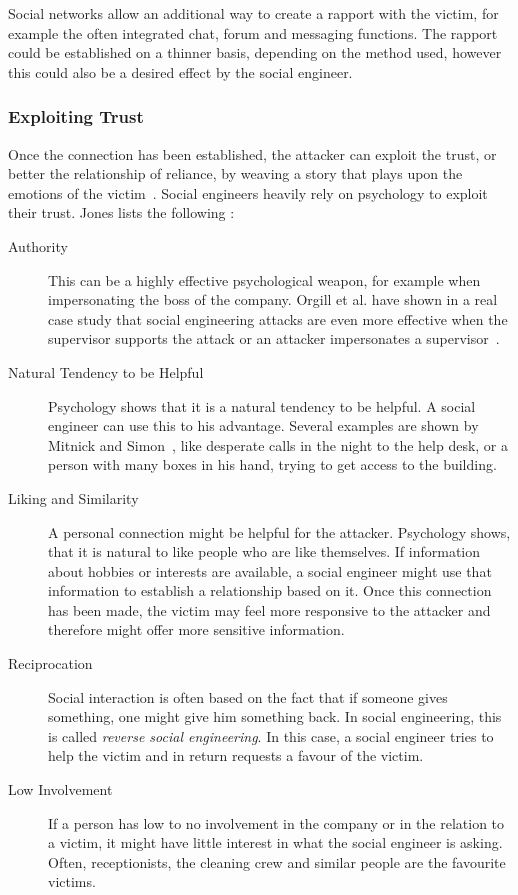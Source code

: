 Social networks allow an additional way to create a rapport with the victim,
for example the often integrated chat, forum and messaging functions. The
rapport could be established on a thinner basis, depending on the method used,
however this could also be a desired effect by the social engineer.


\subsubsection{Exploiting Trust}

Once the connection has been established, the attacker can exploit the trust,
or better the relationship of reliance, by \glqq{}weaving a story that plays
upon the emotions of the victim\grqq{}~\cite{thornburgh2004}. Social engineers
heavily rely on psychology to exploit their trust. Jones lists the following
\cite{jones2004}:

\begin{description}

\item[Authority] This can be a highly effective psychological weapon, for
  example when impersonating the boss of the company. Orgill et al. have
  shown in a real case study that social engineering attacks are even more
  effective when the supervisor supports the attack or an attacker
  impersonates a supervisor~\cite{orgill2004}.
\item[Natural Tendency to be Helpful] Psychology shows that it is a natural
  tendency to be helpful. A social engineer can use this to his advantage.
  Several examples are shown by Mitnick and Simon~\cite{mitnick2003}, like
  desperate calls in the night to the help desk, or a person with many boxes
  in his hand, trying to get access to the building.
\item[Liking and Similarity] A personal connection might be helpful for the
  attacker. Psychology shows, that it is natural to like people who are like
  themselves. If information about hobbies or interests are available, a social
  engineer might use that information to establish a relationship based on 
  it. Once this connection has been made, the victim may feel more
  responsive to the attacker and therefore might offer more sensitive
  information.
\item[Reciprocation] Social interaction is often based on the fact that if
  someone gives something, one might give him something back. In social
  engineering, this is called \textit{reverse social engineering}. In this case, a
  social engineer tries to help the victim and in return requests a favour of
  the victim.
\item[Low Involvement] If a person has low to no involvement in the company or
  in the relation to a victim, it might have little interest in what the social engineer is
  asking. Often, receptionists, the cleaning crew and similar people are the
  favourite victims.
\end{description}

